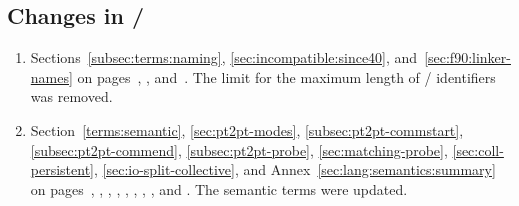 \subsection{Changes in \texorpdfstring{\MPIIVDOTO/}{MPI-4.0}}
\label{subsec:changes-31-40}

\begin{enumerate}

\item
  Sections~\ref{subsec:terms:naming}, \ref{sec:incompatible:since40}, and~\ref{sec:f90:linker-names}
  on pages~\pageref{subsec:terms:naming}, \pageref{sec:incompatible:since40}, and~\pageref{sec:f90:linker-names}.
  \newline
  The limit for the maximum length of \MPI/ identifiers was removed.

\item
{} Section~\ref{terms:semantic},
\ref{sec:pt2pt-modes}, \ref{subsec:pt2pt-commstart},
\ref{subsec:pt2pt-commend}, \ref{subsec:pt2pt-probe},
\ref{sec:matching-probe},
\ref{sec:coll-persistent},
\ref{sec:io-split-collective}, and
Annex~\ref{sec:lang:semantics:summary} on
pages~\pageref{terms:semantic}, \pageref{sec:pt2pt-modes},
\pageref{subsec:pt2pt-commstart}, \pageref{subsec:pt2pt-commend},
\pageref{subsec:pt2pt-probe}, \pageref{sec:matching-probe},
\pageref{sec:coll-persistent},
\pageref{sec:io-split-collective}, and
\pageref{sec:lang:semantics:summary}.
\newline
The semantic terms were updated.


\end{enumerate}
